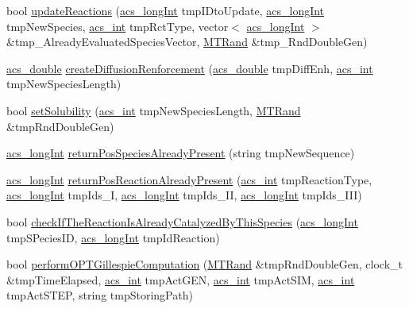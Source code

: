 \begin{DoxyCompactItemize}
\item 
bool \hyperlink{a00014_ace92235425bfbe692e3873ba5bb07639}{update\-Reactions} (\hyperlink{a00050_a19319d75f02db4308bc5c0026d98cd85}{acs\-\_\-long\-Int} tmp\-I\-Dto\-Update, \hyperlink{a00050_a19319d75f02db4308bc5c0026d98cd85}{acs\-\_\-long\-Int} tmp\-New\-Species, \hyperlink{a00050_a8d277355641a098190360234e2ebde35}{acs\-\_\-int} tmp\-Rct\-Type, vector$<$ \hyperlink{a00050_a19319d75f02db4308bc5c0026d98cd85}{acs\-\_\-long\-Int} $>$ \&tmp\-\_\-\-Already\-Evaluated\-Species\-Vector, \hyperlink{a00016}{M\-T\-Rand} \&tmp\-\_\-\-Rnd\-Double\-Gen)
\item 
\hyperlink{a00050_ab776853a005fcbf56af0424a2a4dd607}{acs\-\_\-double} \hyperlink{a00014_af795a4d1f04dfbfcbdf321e20e74f9c2}{create\-Diffusion\-Renforcement} (\hyperlink{a00050_ab776853a005fcbf56af0424a2a4dd607}{acs\-\_\-double} tmp\-Diff\-Enh, \hyperlink{a00050_a8d277355641a098190360234e2ebde35}{acs\-\_\-int} tmp\-New\-Species\-Length)
\item 
bool \hyperlink{a00014_a496ba50d3a345cd842ce42406946405c}{set\-Solubility} (\hyperlink{a00050_a8d277355641a098190360234e2ebde35}{acs\-\_\-int} tmp\-New\-Species\-Length, \hyperlink{a00016}{M\-T\-Rand} \&tmp\-Rnd\-Double\-Gen)
\item 
\hyperlink{a00050_a19319d75f02db4308bc5c0026d98cd85}{acs\-\_\-long\-Int} \hyperlink{a00014_a4e26cc574e20a5afcfbbe5887109c5af}{return\-Pos\-Species\-Already\-Present} (string tmp\-New\-Sequence)
\item 
\hyperlink{a00050_a19319d75f02db4308bc5c0026d98cd85}{acs\-\_\-long\-Int} \hyperlink{a00014_a6feec5685b519ba0cdae0e5c59dffff0}{return\-Pos\-Reaction\-Already\-Present} (\hyperlink{a00050_a8d277355641a098190360234e2ebde35}{acs\-\_\-int} tmp\-Reaction\-Type, \hyperlink{a00050_a19319d75f02db4308bc5c0026d98cd85}{acs\-\_\-long\-Int} tmp\-Ids\-\_\-\-I, \hyperlink{a00050_a19319d75f02db4308bc5c0026d98cd85}{acs\-\_\-long\-Int} tmp\-Ids\-\_\-\-I\-I, \hyperlink{a00050_a19319d75f02db4308bc5c0026d98cd85}{acs\-\_\-long\-Int} tmp\-Ids\-\_\-\-I\-I\-I)
\item 
bool \hyperlink{a00014_ac4c90b07b8e75ea03e2ced0ea644a69f}{check\-If\-The\-Reaction\-Is\-Already\-Catalyzed\-By\-This\-Species} (\hyperlink{a00050_a19319d75f02db4308bc5c0026d98cd85}{acs\-\_\-long\-Int} tmp\-S\-Pecies\-I\-D, \hyperlink{a00050_a19319d75f02db4308bc5c0026d98cd85}{acs\-\_\-long\-Int} tmp\-Id\-Reaction)
\item 
bool \hyperlink{a00014_a90fba3b2cc589f32c97a74540620bd84}{perform\-O\-P\-T\-Gillespie\-Computation} (\hyperlink{a00016}{M\-T\-Rand} \&tmp\-Rnd\-Double\-Gen, clock\-\_\-t \&tmp\-Time\-Elapsed, \hyperlink{a00050_a8d277355641a098190360234e2ebde35}{acs\-\_\-int} tmp\-Act\-G\-E\-N, \hyperlink{a00050_a8d277355641a098190360234e2ebde35}{acs\-\_\-int} tmp\-Act\-S\-I\-M, \hyperlink{a00050_a8d277355641a098190360234e2ebde35}{acs\-\_\-int} tmp\-Act\-S\-T\-E\-P, string tmp\-Storing\-Path)

\end{DoxyCompactItemize}
